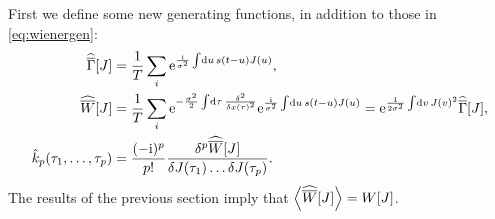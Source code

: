 \documentclass[12pt]{article}
\theoremstyle{slplain}
\theoremstyle{sldefinition}
\theoremstyle{remark}
\newcommand{\hhz}{\widehat{\overline{\Gamma}}}
\newcommand{\hhw}{\widehat{\overline{W}}}
\begin{document}
First we define some new generating functions, in addition to those in \eqref{eq:wienergen}:
%
\begin{equation}\label{eq:ratewienergen}
  \begin{aligned}
    \hhz[J] &= \frac{1}{T}\sum_i\e^{\frac{\ir}{\sigma^2}\intd{u}s(t-u)J(u)}, \\
    \hhw[J] &= \frac{1}{T}\sum_i\e^{-\frac{\sigma^2}{2}\intd{\tau}\fdf{^2}{x(\tau)^2}} \e^{\frac{\ir}{\sigma^2}\intd{u}s(t-u)J(u)}
    =  \e^{\frac{1}{2\sigma^2} \intd{v}J(v)^2} \hhz[J], \\
    \hat{k}_p(\tau_1,\ldots,\tau_p) &= \frac{(-\ir)^{p}}{p!} \fdf{^p \hhw[J]}{J(\tau_1)\ldots\delta J(\tau_p)}.
  \end{aligned}
\end{equation}
%
The results of the previous section imply that $\av{\hhw[J]}=W[J]$.
\end{document}
